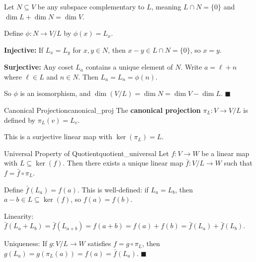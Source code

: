 \documentclass[11pt, letterpaper, openany]{book}
\renewenvironment{proof}[1][\proofname]{%
  \tcolorbox[blanker, breakable, left=1em,
    before skip=1em, after skip=1em,
    borderline west={2pt}{0pt}{MagicTeal!50},
    colback=MagicCream,
    before upper={\textcolor{MagicTeal}{\sffamily\bfseries #1.}\space}
  ]%
}{%
  \hfill\textcolor{MagicTeal}{\ensuremath{\blacksquare}}\endtcolorbox%
}
\begin{document}
\begin{proof}
Let $N \subseteq V$ be any subspace complementary to $L$, meaning $L \cap N = \{0\}$ and $\dim L + \dim N = \dim V$.

Define $\phi: N \to V/L$ by $\phi(x) = L_x$.

\textbf{Injective:} If $L_x = L_y$ for $x, y \in N$, then $x - y \in L \cap N = \{0\}$, so $x = y$.

\textbf{Surjective:} Any coset $L_a$ contains a unique element of $N$. Write $a = \ell + n$ where $\ell \in L$ and $n \in N$. Then $L_a = L_n = \phi(n)$.

So $\phi$ is an isomorphism, and $\dim(V/L) = \dim N = \dim V - \dim L$.
\end{proof}

\begin{defn}{Canonical Projection}{canonical_proj}
The \textbf{canonical projection} $\pi_L: V \to V/L$ is defined by $\pi_L(v) = L_v$.

This is a surjective linear map with $\ker(\pi_L) = L$.
\end{defn}

\begin{thm}{Universal Property of Quotient}{quotient_universal}
Let $f: V \to W$ be a linear map with $L \subseteq \ker(f)$. Then there exists a unique linear map $\bar{f}: V/L \to W$ such that $f = \bar{f} \circ \pi_L$.

\begin{center}
\end{center}
\end{thm}

\begin{proof}
Define $\bar{f}(L_a) = f(a)$. This is well-defined: if $L_a = L_b$, then $a - b \in L \subseteq \ker(f)$, so $f(a) = f(b)$.

Linearity: $\bar{f}(L_a + L_b) = \bar{f}(L_{a+b}) = f(a+b) = f(a) + f(b) = \bar{f}(L_a) + \bar{f}(L_b)$.

Uniqueness: If $g: V/L \to W$ satisfies $f = g \circ \pi_L$, then $g(L_a) = g(\pi_L(a)) = f(a) = \bar{f}(L_a)$.
\end{proof}
\end{document}
